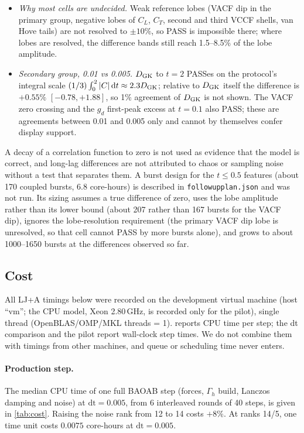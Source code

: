 \documentclass[11pt]{article}
\DeclareRobustCommand{\_}{\textunderscore\allowbreak}
\theoremstyle{remark}
\theoremstyle{definition}
\newcommand{\dd}{\,\mathrm{d}}
\newcommand{\Gh}{\Gamma_h}
\begin{document}
\begin{itemize}
\item \emph{Why most cells are undecided.} Weak reference lobes (VACF dip in the primary group, negative lobes of $C_L$, $C_T$,
second and third VCCF shells, van Hove tails) are not resolved to $\pm10\%$, so PASS is impossible there; where lobes are resolved,
the difference bands still reach 1.5--8.5\% of the lobe amplitude.
\item \emph{Secondary group, 0.01 vs 0.005.} $D_{\rm GK}$ to $t=2$ PASSes on the protocol's integral scale
$(1/3)\int_0^2|C|\dd t\approx2.3D_{\rm GK}$; relative to $D_{\rm GK}$ itself the difference is $+0.55\%$ $[-0.78,+1.88]$, so 1\%
agreement of $D_{\rm GK}$ is not shown. The VACF zero crossing and the $g_d$ first-peak excess at $t=0.1$ also PASS; these are
agreements between 0.01 and 0.005 only and cannot by themselves confer display support.
\end{itemize}
A decay of a correlation function to zero is not used as evidence that the model is correct, and long-lag differences are not
attributed to chaos or sampling noise without a test that separates them. A burst design for the $t\le0.5$ features (about 170
coupled bursts, 6.8 core-hours) is described in \texttt{followup\_plan.json} and was not run. Its sizing assumes a true difference of
zero, uses the lobe amplitude rather than its lower bound (about 207 rather than 167 bursts for the VACF dip), ignores the lobe-resolution
requirement (the primary VACF dip lobe is unresolved, so that cell cannot PASS by more bursts alone), and grows to about 1000--1650
bursts at the differences observed so far.

\subsection{Cost}\label{sec:numerics_cost}

All LJ+A timings below were recorded on the development virtual machine (host ``vm''; the CPU model, Xeon 2.80\,GHz, is recorded only
for the pilot), single thread (OpenBLAS/OMP/MKL threads = 1).  reports CPU time per step; the dt comparison and the
pilot report wall-clock step times. We do
not combine them with timings from other machines, and queue or scheduling time never enters.

\paragraph{Production step.}
The median CPU time of one full BAOAB step (forces, $\Gh$ build, Lanczos damping and noise) at $\mathrm{dt}=0.005$, from 6
interleaved rounds of 40 steps, is given in \cref{tab:cost}. Raising the noise rank from 12 to 14 costs $+8\%$. At ranks 14/5,
one time unit costs $0.0075$ core-hours at $\mathrm{dt}=0.005$.
\end{document}

